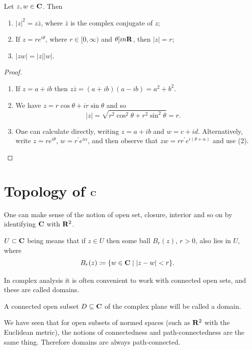 \begin{lemma}
Let $z,w\in\mathbf C$. Then
\begin{enumerate}[label=(\arabic*)]
\item $|z|^2=z\bar{z}$, where $\bar{z}$ is the complex conjugate of $z$;
\item If $z=re^{i\theta}$, where $r\in[0,\infty)$ and $\theta]in\mathbf R$, then $|z|=r$;
\item $|zw| = |z||w|$.
\end{enumerate}
\end{lemma}

\begin{proof} \
\begin{enumerate}[label=(\arabic*)]
\item If $z=a+ib$ then $z\bar{z}=(a+ib)(a-ib)=a^2+b^2$.
\item We have $z=r\cos\theta+ir\sin\theta$ and so
\[|z|=\sqrt{r^2\cos^2\theta+r^2\sin^2\theta}=r.\]
\item One can calculate directly, writing $z=a+ib$ and $w=c+id$. Alternatively, write $z=re^{i\theta}$, $w=r^\prime e^{i\alpha}$, and then observe that $zw=rr^\prime e^{i(\theta+\alpha)}$ and use (2).
\end{enumerate}
\end{proof}

\section{Topology of $\mathbf C$}
One can make sense of the notion of open set, closure, interior and so on by identifying $\mathbf C$ with $\mathbf R^2$.

\begin{definition}
$U\subset\mathbf C$ being  means that if $z\in U$ then some ball $B_r(z)$, $r>0$, also lies in $U$, where
\[B_r(z)\coloneqq\{w\in\mathbf C\mid|z-w|<r\}.\]
\end{definition}

In complex analysis it is often convenient to work with connected open sets, and these are called domains.

\begin{definition}
A connected open subset $D\subseteq\mathbf C$ of the complex plane will be called a domain.
\end{definition}

We have seen that for open subsets of normed spaces (such as $\mathbf R^2$ with the Euclidean metric), the notions of connectedness and path-connectedness are the same thing. Therefore domains are always path-connected.

